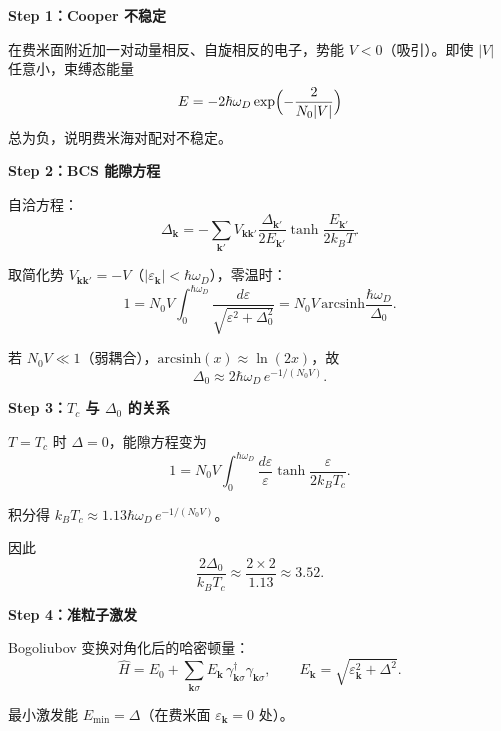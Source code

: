 \begin{derivationbox}
\textbf{Step 1：Cooper 不稳定}

在费米面附近加一对动量相反、自旋相反的电子，势能 $V<0$（吸引）。即使 $|V|$ 任意小，束缚态能量
\[
E=-2\hbar\omega_D\exp\Bigl(-\frac{2}{N_0|V|}\Bigr)
\]
总为负，说明费米海对配对不稳定。

\textbf{Step 2：BCS 能隙方程}

自洽方程：
\[
\Delta_{\mathbf{k}}=-\sum_{\mathbf{k}'}V_{\mathbf{k}\mathbf{k}'}\frac{\Delta_{\mathbf{k}'}}{2E_{\mathbf{k}'}}\tanh\frac{E_{\mathbf{k}'}}{2k_BT}.
\]

取简化势 $V_{\mathbf{k}\mathbf{k}'}=-V$（$|\varepsilon_{\mathbf{k}}|<\hbar\omega_D$），零温时：
\[
1=N_0V\int_0^{\hbar\omega_D}\frac{d\varepsilon}{\sqrt{\varepsilon^2+\Delta_0^2}}
=N_0V\,\text{arcsinh}\frac{\hbar\omega_D}{\Delta_0}.
\]

若 $N_0V\ll1$（弱耦合），$\text{arcsinh}(x)\approx\ln(2x)$，故
\[
\Delta_0\approx2\hbar\omega_D\,e^{-1/(N_0V)}.
\]

\textbf{Step 3：$T_c$ 与 $\Delta_0$ 的关系}

$T=T_c$ 时 $\Delta=0$，能隙方程变为
\[
1=N_0V\int_0^{\hbar\omega_D}\frac{d\varepsilon}{\varepsilon}\tanh\frac{\varepsilon}{2k_BT_c}.
\]

积分得 $k_BT_c\approx1.13\hbar\omega_D\,e^{-1/(N_0V)}$。

因此
\[
\frac{2\Delta_0}{k_BT_c}\approx\frac{2\times2}{1.13}\approx3.52.
\]

\textbf{Step 4：准粒子激发}

Bogoliubov 变换对角化后的哈密顿量：
\[
\hat{H}=E_0+\sum_{\mathbf{k}\sigma}E_{\mathbf{k}}\,\gamma_{\mathbf{k}\sigma}^\dagger\gamma_{\mathbf{k}\sigma},
\qquad E_{\mathbf{k}}=\sqrt{\varepsilon_{\mathbf{k}}^2+\Delta^2}.
\]

最小激发能 $E_{\min}=\Delta$（在费米面 $\varepsilon_{\mathbf{k}}=0$ 处）。
\end{derivationbox}

\vspace{1em}
